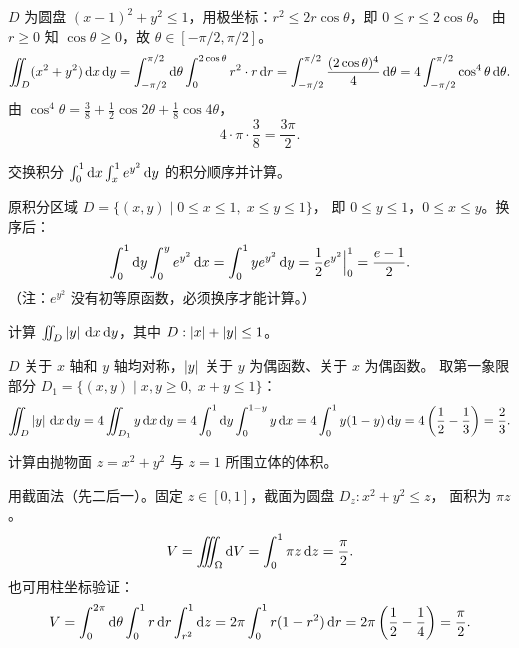 \documentclass{ctexart}
\begin{document}
\begin{solution}
  $D$ 为圆盘 $(x-1)^2 + y^2 \le 1$，用极坐标：$r^2 \le 2r\cos\theta$，即 $0 \le r \le 2\cos\theta$。
  由 $r \ge 0$ 知 $\cos\theta \ge 0$，故 $\theta \in [-\pi/2, \pi/2]$。
  \[
    \iint_D (x^2+y^2) \,\mathrm{d} x\,\mathrm{d} y
    = \int_{-\pi/2}^{\pi/2} \mathrm{d} \theta \int_0^{2\cos\theta} r^2 \cdot r \,\mathrm{d} r
    = \int_{-\pi/2}^{\pi/2} \frac{(2\cos\theta)^4}{4} \,\mathrm{d} \theta
    = 4 \int_{-\pi/2}^{\pi/2} \cos^4\theta \,\mathrm{d} \theta.
  \]
  由 $\cos^4\theta = \frac{3}{8} + \frac{1}{2}\cos 2\theta + \frac{1}{8}\cos 4\theta$，
  \[
    4 \cdot \pi \cdot \frac{3}{8} = \frac{3\pi}{2}.
  \]
\end{solution}

\begin{exercise}[积分换序]
  交换积分 $\int_0^1 \mathrm{d} x \int_x^1 e^{y^2} \,\mathrm{d} y$ 的积分顺序并计算。
\end{exercise}

\begin{solution}
  原积分区域 $D = \{(x,y) \mid 0 \le x \le 1,\; x \le y \le 1\}$，
  即 $0 \le y \le 1$，$0 \le x \le y$。换序后：
  \[
    \int_0^1 \mathrm{d} y \int_0^y e^{y^2} \,\mathrm{d} x
    = \int_0^1 y e^{y^2} \,\mathrm{d} y
    = \frac{1}{2} e^{y^2} \Big|_0^1
    = \frac{e-1}{2}.
  \]
  （注：$e^{y^2}$ 没有初等原函数，必须换序才能计算。）
\end{solution}

\begin{exercise}[利用对称性]
  计算 $\iint_D \left| y \right| \,\mathrm{d} x\,\mathrm{d} y$，其中 $D: \left| x \right| + \left| y \right| \le 1$。
\end{exercise}

\begin{solution}
  $D$ 关于 $x$ 轴和 $y$ 轴均对称，$\left| y \right|$ 关于 $y$ 为偶函数、关于 $x$ 为偶函数。
  取第一象限部分 $D_1 = \{(x,y) \mid x,y \ge 0,\; x+y \le 1\}$：
  \[
    \iint_D \left| y \right| \,\mathrm{d} x\,\mathrm{d} y
    = 4 \iint_{D_1} y \,\mathrm{d} x\,\mathrm{d} y
    = 4 \int_0^1 \mathrm{d} y \int_0^{1-y} y \,\mathrm{d} x
    = 4 \int_0^1 y(1-y) \,\mathrm{d} y
    = 4 \left( \frac{1}{2} - \frac{1}{3} \right)
    = \frac{2}{3}.
  \]
\end{solution}

\begin{exercise}
  计算由抛物面 $z = x^2 + y^2$ 与 $z = 1$ 所围立体的体积。
\end{exercise}

\begin{solution}
  用截面法（先二后一）。固定 $z \in [0,1]$，截面为圆盘 $D_z: x^2+y^2 \le z$，
  面积为 $\pi z$。
  \[
    V = \iiint_\Omega \mathrm{d} V
    = \int_0^1 \pi z \,\mathrm{d} z
    = \frac{\pi}{2}.
  \]
  也可用柱坐标验证：
  \[
    V = \int_0^{2\pi} \mathrm{d} \theta \int_0^1 r \,\mathrm{d} r \int_{r^2}^1 \mathrm{d} z
    = 2\pi \int_0^1 r(1-r^2) \,\mathrm{d} r
    = 2\pi \left( \frac{1}{2} - \frac{1}{4} \right) = \frac{\pi}{2}.
  \]
\end{solution}
\end{document}
